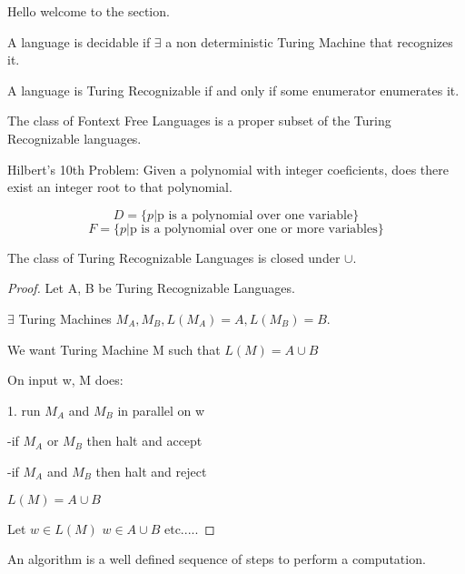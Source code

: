 
Hello welcome to the section.

\begin{corollary}
    A language is decidable if $\exists$ a non deterministic Turing Machine that recognizes it.
\end{corollary}

\begin{theorem}
    A language is Turing Recognizable if and only if some enumerator enumerates it.
\end{theorem}

\begin{theorem}
    The class of Fontext Free Languages is a proper subset of the Turing Recognizable languages.
\end{theorem}

Hilbert's 10th Problem: Given a polynomial with integer coeficients, does there exist an integer root to that polynomial.

\[D = \{p|\text{p is a polynomial over one variable}\}  \]
\[F = \{p|\text{p is a polynomial over one or more variables}\}  \]

\begin{theorem}
The class of Turing Recognizable Languages is closed under $\cup$.
\end{theorem}

\begin{proof}
    Let A, B be Turing Recognizable Languages.

    $\exists$ Turing Machines $M_A, M_B, L(M_A)=A, L(M_B)=B$.

    We want Turing Machine M such that $L(M)=A\cup B$

    On input w, M does:

    1. run $M_A$ and $M_B$ in parallel on w

        -if $M_A$ or $M_B$ then halt and accept
        
        -if $M_A$ and $M_B$ then halt and reject

    \begin{claim}
        $L(M)=A\cup B$
    \end{claim}
    Let $w\in L(M)$
    $w\in A\cup B$ etc.....
\end{proof}





\begin{definition}
    An algorithm is a well defined sequence of steps to perform a computation.
\end{definition}


